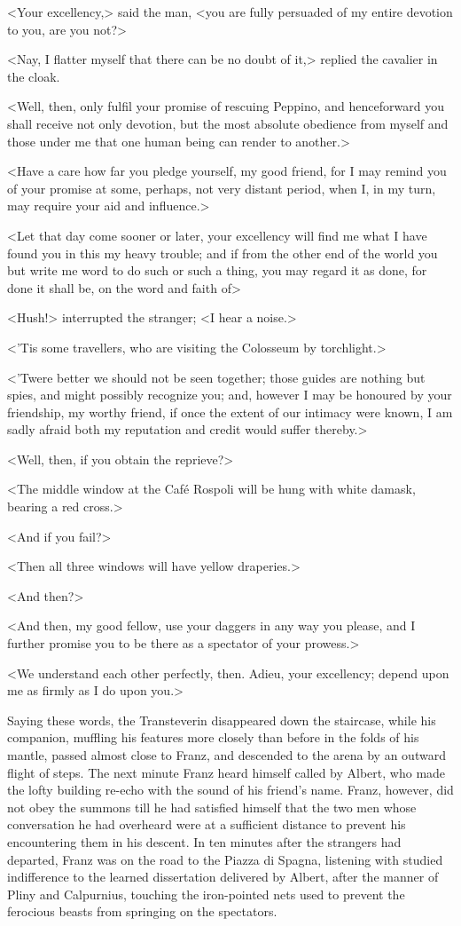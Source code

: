  <Your excellency,> said the man, <you are fully persuaded of my entire devotion to you, are you not?> 

 <Nay, I flatter myself that there can be no doubt of it,> replied the cavalier in the cloak. 

 <Well, then, only fulfil your promise of rescuing Peppino, and henceforward you shall receive not only devotion, but the most absolute obedience from myself and those under me that one human being can render to another.> 

 <Have a care how far you pledge yourself, my good friend, for I may remind you of your promise at some, perhaps, not very distant period, when I, in my turn, may require your aid and influence.> 

 <Let that day come sooner or later, your excellency will find me what I have found you in this my heavy trouble; and if from the other end of the world you but write me word to do such or such a thing, you may regard it as done, for done it shall be, on the word and faith of\longdash> 

 <Hush!> interrupted the stranger; <I hear a noise.> 

 <'Tis some travellers, who are visiting the Colosseum by torchlight.> 

 <'Twere better we should not be seen together; those guides are nothing but spies, and might possibly recognize you; and, however I may be honoured by your friendship, my worthy friend, if once the extent of our intimacy were known, I am sadly afraid both my reputation and credit would suffer thereby.> 

 <Well, then, if you obtain the reprieve?> 

 <The middle window at the Café Rospoli will be hung with white damask, bearing a red cross.> 

 <And if you fail?> 

 <Then all three windows will have yellow draperies.> 

 <And then?> 

 <And then, my good fellow, use your daggers in any way you please, and I further promise you to be there as a spectator of your prowess.> 

 <We understand each other perfectly, then. Adieu, your excellency; depend upon me as firmly as I do upon you.> 

 Saying these words, the Transteverin disappeared down the staircase, while his companion, muffling his features more closely than before in the folds of his mantle, passed almost close to Franz, and descended to the arena by an outward flight of steps. The next minute Franz heard himself called by Albert, who made the lofty building re-echo with the sound of his friend's name. Franz, however, did not obey the summons till he had satisfied himself that the two men whose conversation he had overheard were at a sufficient distance to prevent his encountering them in his descent. In ten minutes after the strangers had departed, Franz was on the road to the Piazza di Spagna, listening with studied indifference to the learned dissertation delivered by Albert, after the manner of Pliny and Calpurnius, touching the iron-pointed nets used to prevent the ferocious beasts from springing on the spectators. 

